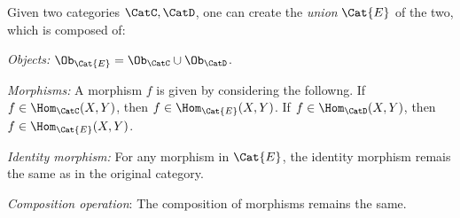 \begin{shaded}
\begin{definition}
Given two categories $\CatC,\CatD$, one can create the \emph{union} $\Cat{E}$ of the two, which is composed of:
\begin{compactenum}
\item \emph{Objects:} $\Ob_\Cat{E}=\Ob_\CatC \cup \Ob_\CatD$.
\item \emph{Morphisms:} A morphism $f$ is given by considering the followng. If $f\in \Hom_\CatC(X,Y)$, then $f\in \Hom_\Cat{E}(X,Y)$. If $f\in \Hom_\CatD(X,Y)$, then $f\in \Hom_\Cat{E}(X,Y)$.
\item \emph{Identity morphism:} For any morphism in $\Cat{E}$, the identity morphism remais the same as in the original category.
\item \emph{Composition operation}: The composition of morphisms remains the same.
\end{compactenum}
\end{definition}
\end{shaded}

%
%
%

